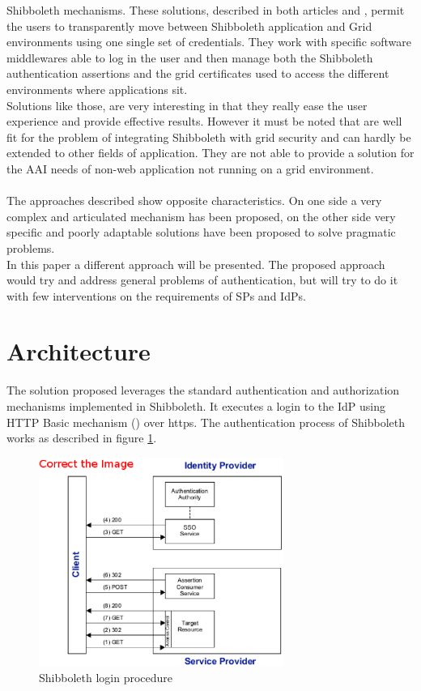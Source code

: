 Shibboleth mechanisms.
These solutions, described in both articles \cite{Wang-2009} and \cite{Jensen-2007}, permit the users to transparently move between Shibboleth
application and Grid environments using one single set of credentials.
They work with specific software middlewares able to log in the user and then manage both the Shibboleth authentication assertions and the
grid certificates used to access the different environments where applications sit.\\
Solutions like those, are very interesting in that they really ease the user experience and provide effective results.
However it must be noted that are well fit for the problem of integrating Shibboleth with grid security and can hardly be extended to other
fields of application.
They are not able to provide a solution for the AAI needs of non-web application not running on a grid environment.\\
\\
The approaches described show opposite characteristics.
On one side a very complex and articulated mechanism has been proposed, on the other side very specific and poorly adaptable solutions
have been proposed to solve pragmatic problems.\\
In this paper a different approach will be presented.
The proposed approach would try and address general problems of authentication, but will try to do it with few interventions on the
requirements of SPs and IdPs.

\label{sec:architecture}
\section{Architecture}
The solution proposed leverages the standard authentication and authorization mechanisms implemented in Shibboleth.
It executes a login to the IdP using HTTP Basic mechanism (\cite{Franks-1999}) over https.
The authentication process of Shibboleth works as described in figure \ref{fig:shiblogin}.

\begin{figure}[h]
\centering
\includegraphics[width=8cm]{Fig1shiblogin.eps}
\caption{Shibboleth login procedure}
\label{fig:shiblogin}
\end{figure}

